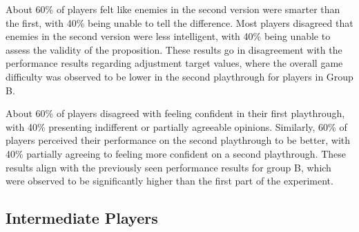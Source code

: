 About 60\% of players felt like enemies in the second version were smarter than the first, with 40\% being unable to tell the difference. Most players disagreed that enemies in the second version were less intelligent, with 40\% being unable to assess the validity of the proposition. These results go in disagreement with the performance results regarding adjustment target values, where the overall game difficulty was observed to be lower in the second playthrough for players in Group B.

About 60\% of players disagreed with feeling confident in their first playthrough, with 40\% presenting indifferent or partially agreeable opinions. Similarly, 60\% of players perceived their performance on the second playthrough to be better, with 40\% partially agreeing to feeling more confident on a second playthrough. These results align with the previously seen performance results for group B, which were observed to be significantly higher than the first part of the experiment.


\subsection{Intermediate Players}



